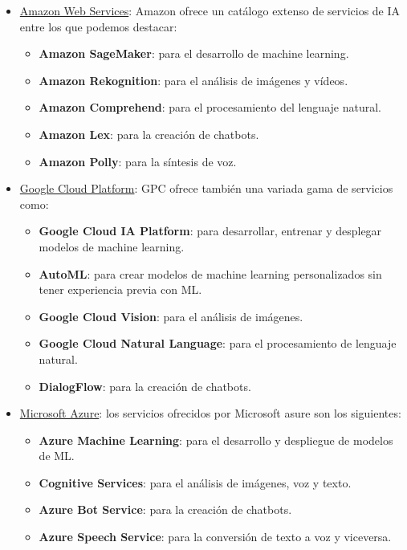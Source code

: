 \begin{itemize}
	\item \href{https://aws.amazon.com/es/}{Amazon Web Services}: Amazon ofrece un catálogo extenso de servicios de IA entre los que podemos destacar:
	\begin{itemize}
		\item \textbf{Amazon SageMaker}: para el desarrollo de machine learning.
		\item \textbf{Amazon Rekognition}: para el análisis de imágenes y vídeos.
		\item \textbf{Amazon Comprehend}: para el procesamiento del lenguaje natural.
		\item \textbf{Amazon Lex}: para la creación de chatbots.
		\item \textbf{Amazon Polly}: para la síntesis de voz.
	\end{itemize}
	
	\item \href{https://cloud.google.com/}{Google Cloud Platform}: GPC ofrece también una variada gama de servicios como:
	\begin{itemize}
		\item \textbf{Google Cloud IA Platform}: para desarrollar, entrenar y desplegar modelos de machine learning.
		\item \textbf{AutoML}: para crear modelos de machine learning personalizados sin tener experiencia previa con ML.
		\item \textbf{Google Cloud Vision}: para el análisis de imágenes.
		\item \textbf{Google Cloud Natural Language}: para el procesamiento de lenguaje natural.
		\item \textbf{DialogFlow}: para la creación de chatbots.
	\end{itemize}
	
	\item \href{https://azure.microsoft.com/es-es/}{Microsoft Azure}: los servicios ofrecidos por Microsoft asure son los siguientes:
	\begin{itemize}
		\item \textbf{Azure Machine Learning}: para el desarrollo y despliegue de modelos de ML.
		\item \textbf{Cognitive Services}: para el análisis de imágenes, voz y texto.
		\item \textbf{Azure Bot Service}: para la creación de chatbots.
		\item \textbf{Azure Speech Service}: para la conversión de texto a voz y viceversa.
	\end{itemize}
	

\end{itemize}
